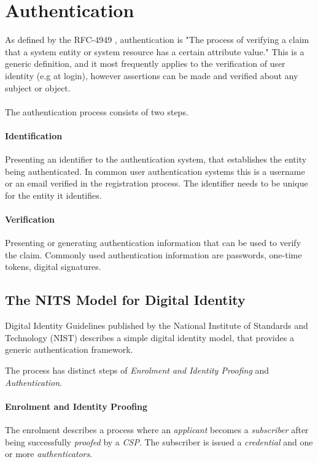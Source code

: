\section{Authentication}

As defined by the RFC-4949 \cite{shirey2007internet}, authentication is "The process of verifying a claim that a system entity or system resource has a certain attribute value."
This is a generic definition, and it most frequently applies to the verification of user identity (e.g at login), however assertions can be made and verified about any subject or object.
\\
\\
The authentication process consists of two steps.
\paragraph{Identification} Presenting an identifier to the authentication system, that establishes the entity being authenticated.
In common user authentication systems this is a username or an email verified in the registration process. The identifier needs to be unique for the entity it identifies.

\paragraph{Verification} Presenting or generating authentication information that can be used to verify the claim.
Commonly used authentication information are passwords, one-time tokens, digital signatures.

\subsection{The NITS Model for Digital Identity}

Digital Identity Guidelines \cite{grassi2017} published by the National Institute of Standards and Technology (NIST) describes a simple digital identity model, that provides a generic authentication framework.

The process has distinct steps of \textit{Enrolment and Identity Proofing} and \textit{Authentication}.

\paragraph{Enrolment and Identity Proofing}

The enrolment describes a process where an \textit{applicant} becomes a \textit{subscriber} after being successfully \textit{proofed} by a \textit{CSP}.
The subscriber is issued a \textit{credential} and one or more \textit{authenticators}.

